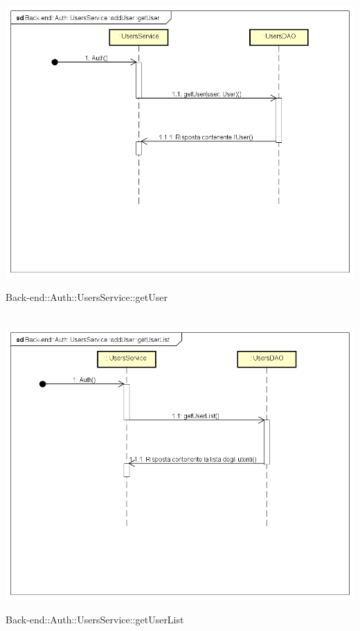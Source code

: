 \\ \includegraphics[width=\textwidth,height=\textheight,keepaspectratio]{images/diagrams/back-end/Ufficial_Backend/Back-end__Auth__UsersService__getUser.png} 	\caption{Back-end::Auth::UsersService::getUser}
\\ \includegraphics[width=\textwidth,height=\textheight,keepaspectratio]{images/diagrams/back-end/Ufficial_Backend/Back-end__Auth__UsersService__getUserList.png} 	\caption{Back-end::Auth::UsersService::getUserList}
